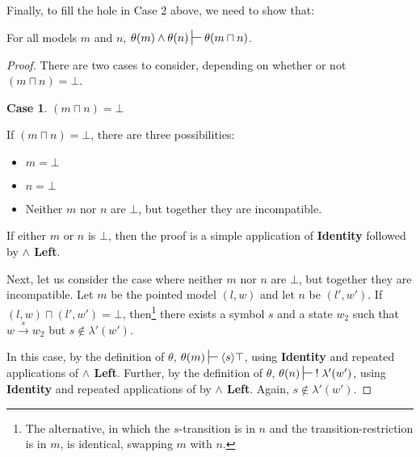 \documentclass[smallextended]{svjour3}       %
\newtheorem{mycase}{Case}
\numberwithin{subcase}{mycase}
\def\judge {\sststile{\mathrm{}}{}}
\begin{document}
Finally, to fill the hole in Case 2 above, we need to show that:
\begin{lemma}
For all models $m$ and $n$, $\theta(m) \land \theta(n) \judge \theta (m \sqcap n)$.
\end{lemma}

\begin{proof}

There are two cases to consider, depending on whether or not $(m \sqcap n) = \bot$.

\setcounter{mycase}{0}

\begin{mycase}
$(m \sqcap n) = \bot$
\end{mycase}
If $(m \sqcap n) = \bot$, there are three possibilities:
\begin{itemize}
\item
$m = \bot$
\item
$n = \bot$
\item
Neither $m$ nor $n$ are $\bot$, but together they are incompatible. 
\end{itemize}
If either $m$ or $n$ is $\bot$, then the proof is a simple application of {\bf Identity} followed by {\bf $\land$ Left}.

Next, let us consider the case where neither $m$ nor $n$ are $\bot$, but together they are incompatible.
Let $m$ be the pointed model $(l, w)$ and let $n$ be $(l', w')$.
If $(l, w) \sqcap (l', w') = \bot$, then\footnote{The alternative, in which the $s$-transition is in $n$ and the transition-restriction is in $m$, is identical, swapping $m$ with $n$.} there exists a symbol $s$ and a state $w_2$ such that $w \xrightarrow{s} w_2$ but $s \notin \lambda'(w')$.

In this case, by the definition of $\theta$, $\theta(m) \judge \langle s \rangle \top$, using  {\bf Identity} and repeated applications of {\bf $\land$ Left}.
Further, by the definition of $\theta$, $\theta(n) \judge \; ! \; \lambda'(w')$, using  {\bf Identity} and repeated applications of by {\bf $\land$ Left}. Again, $s \notin  \lambda'(w')$.


\end{proof}
\end{document}
